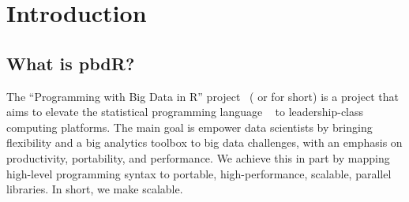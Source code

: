 \chapter[Introduction]{Introduction}
\label{sec:introduction}
%








\section{What is pbdR?}

The ``Programming with Big Data in R'' project~\citep{pbdR2012}
( or 
for short) is a project that aims to elevate the statistical programming
language ~\citep{Rcore} to leadership-class computing platforms.
The main goal is empower data scientists by bringing flexibility and a big
analytics toolbox to big data challenges, with an emphasis on productivity,
portability, and performance.  We achieve this in part by mapping high-level
programming syntax to portable, high-performance, scalable, parallel libraries.
In short, we make  scalable.

